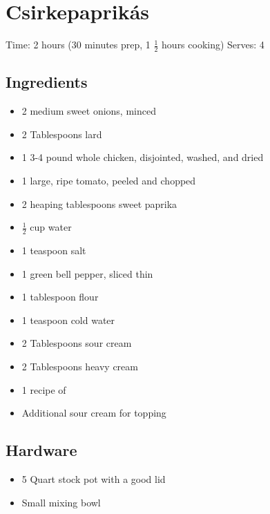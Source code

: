 \section{Csirkepaprikás}
\label{csirkePaprikas}
\setcounter{secnumdepth}{0}
Time: 2 hours (30 minutes prep, 1 \( \frac{1}{2} \) hours cooking)
Serves: 4

\begin{multicols}{2}
\subsection*{Ingredients}
\begin{itemize}
    \item 2 medium sweet onions, minced
    \item 2 Tablespoons lard
    \item 1 3-4 pound whole chicken, disjointed, washed, and dried
    \item 1 large, ripe tomato, peeled and chopped
    \item 2 heaping tablespoons sweet paprika
    \item \( \frac{1}{2} \) cup water
    \item 1 teaspoon salt
    \item 1 green bell pepper, sliced thin
    \item 1 tablespoon flour
    \item 1 teaspoon cold water
    \item 2 Tablespoons sour cream
    \item 2 Tablespoons heavy cream
    \item 1 recipe of 
    \item Additional sour cream for topping
\end{itemize}

\subsection*{Hardware}
\begin{itemize}
    \item 5 Quart stock pot with a good lid
    \item Small mixing bowl
\end{itemize}
\clearpage


\end{multicols}
